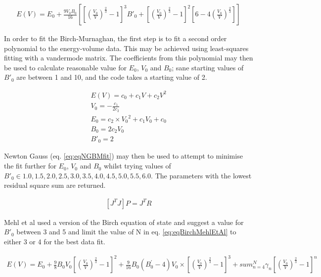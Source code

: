 \begin{equation}
\begin{split}
E(V) = E_0 + \frac{9 V_0 B_0}{16} \left[ \left[ \left(\frac{V_0}{V} \right)^{\frac{2}{3}}-1\right]^{3} {B'}_0 + \left[ \left(\frac{V_0}{V} \right)^{\frac{2}{3}}-1\right]^{2} \left[6 - 4 \left(\frac{V_0}{V} \right)^{\frac{2}{3}}\right] \right]
\end{split}
\label{eq:eqMurnachanEquationofStateVolume}
\end{equation}

In order to fit the Birch-Murnaghan, the first step is to fit a second order polynomial to the energy-volume data.  This may be achieved using least-squares fitting with a vandermode matrix.  The coefficients from this polynomial may then be used to calculate reasonable value for $E_0$, $V_0$ and $B_0$; sane starting values of ${B'}_0$ are between 1 and 10, and the code takes a starting value of 2\cite{gilgamesheos}.

\begin{equation}
\begin{split}
E(V) = c_0 + c_1 V + c_2 V^2 \\
V_0 = -\frac{c_1}{2c_2} \\
E_0 = c_2 \times {V_0}^2 + c_1 V_0 + c_0  \\
B_0 = 2 c_2 V_0 \\
{B'}_0 = 2
\end{split}
\label{eq:eqMurnachanEquationofStateVolume}
\end{equation}

Newton Gauss (eq. \ref{eq:eqNGBMfit}) may then be used to attempt to minimise the fit further for $E_0$, $V_0$ and $B_0$ whilst trying values of ${B'}_0 \in {1.0,1.5,2.0,2.5,3.0,3.5,4.0,4.5,5.0,5.5,6.0}$.  The parameters with the lowest residual square sum are returned.

\begin{equation}
\begin{split}
\left[J^T J\right] P = J^T R
\end{split}
\label{eq:eqNGBMfit}
\end{equation}

Mehl et al used a version of the Birch equation of state\cite{birchmurnaghaneq} and suggest a value for ${B'}_0$ between 3 and 5\cite{mehlsp} and limit the value of N in eq. \ref{eq:eqBirchMehlEtAl} to either 3 or 4 for the best data fit.

\begin{equation}
\begin{split}
E(V) = E_0 + \frac{9}{8} B_0 V_0 \left[ \left(\frac{V_0}{V}\right)^{\frac{2}{3}} - 1 \right]^{2} + \frac{9}{16} B_0(B_0^{'} - 4) V_0 \times \left[ \left(\frac{V_0}{V}\right)^{\frac{2}{3}} - 1 \right]^{3} + sum_{n=4}^{N} \gamma_n \left[ \left(\frac{V_0}{V}\right)^{\frac{2}{3}} - 1 \right]^{n}
\end{split}
\label{eq:eqBirchMehlEtAl}
\end{equation}

